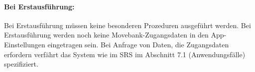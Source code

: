 \documentclass[12pt]{article} %
\begin{document}
\paragraph{Bei Erstausführung:} Bei Erstausführung müssen keine besonderen
Prozeduren ausgeführt werden. Bei Erstausführung werden noch keine Movebank-Zugangsdaten in den App-Einstellungen eingetragen sein. Bei Anfrage von Daten,
die Zugangsdaten erfordern verfährt das System wie im SRS im Abschnitt 7.1 (Anwendungsfälle) spezifiziert. 







\end{document}
